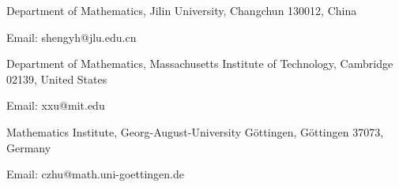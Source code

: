 \documentclass[letterpaper,10pt, oneside]{article} %
\begin{document}
{}

 \vspace{3mm}
Department of Mathematics, Jilin University,
 Changchun 130012,  China

Email: shengyh@jlu.edu.cn
 \vspace{3mm}

Department of Mathematics, Massachusetts Institute of Technology,
Cambridge 02139, United States

Email: xxu@mit.edu
 \vspace{3mm}

Mathematics Institute, Georg-August-University
G\"ottingen,  G\"ottingen 37073, Germany

Email: czhu@math.uni-goettingen.de
\end{document}
